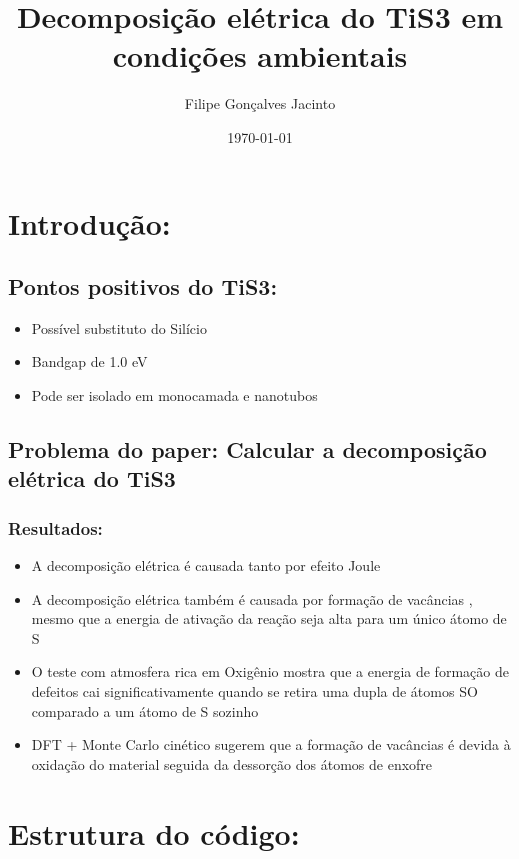 \documentclass[11pt]{article}
\author{Filipe Gonçalves Jacinto}
\date{\today}
\title{Decomposição elétrica do TiS3 em condições ambientais}
\begin{document}
\maketitle
\tableofcontents



\section{Introdução:}
\label{sec:org636aef8}
\subsection{Pontos positivos do TiS3:}
\label{sec:org235eae6}
\begin{itemize}
\item Possível substituto do Silício
\item Bandgap de 1.0 eV
\item Pode ser isolado em monocamada e nanotubos
\end{itemize}
\subsection{Problema do paper: Calcular a decomposição elétrica do TiS3}
\label{sec:orgebbe8f3}
\subsubsection{Resultados:}
\label{sec:orgb670691}
\begin{itemize}
\item A decomposição elétrica é causada tanto por efeito Joule
\item A decomposição elétrica também é causada por formação de vacâncias , mesmo que a energia de ativação da reação seja alta para um único átomo de S
\item O teste com atmosfera rica em Oxigênio mostra que a energia de formação de defeitos cai significativamente quando se retira uma dupla de átomos SO comparado a um átomo de S sozinho
\item DFT + Monte Carlo cinético sugerem que a formação de vacâncias é devida à oxidação do material seguida da dessorção dos átomos de enxofre
\end{itemize}


\section{Estrutura do código:}
\label{sec:orga90337a}
\end{document}
